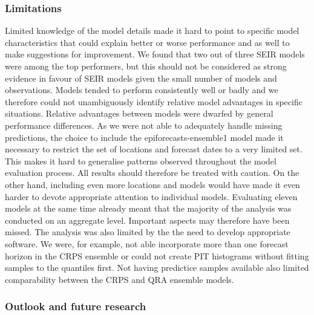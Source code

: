 \documentclass[
]{book}
\begin{document}
\hypertarget{limitations}{%
\subsubsection*{Limitations}\label{limitations}}

Limited knowledge of the model details made it hard to point to specific model characteristics that could explain better or worse performance and as well to make suggestions for improvement. We found that two out of three SEIR models were among the top performers, but this should not be considered as strong evidence in favour of SEIR models given the small number of models and observations. Models tended to perform consistently well or badly and we therefore could not unambiguously identify relative model advantages in specific situations. Relative advantages between models were dwarfed by general performance differences.
As we were not able to adequately handle missing predictions, the choice to include the epiforecasts-ensemble1 model made it necessary to restrict the set of locations and forecast dates to a very limited set. This makes it hard to generalise patterns observed throughout the model evaluation process. All results should therefore be treated with caution. On the other hand, including even more locations and models would have made it even harder to devote appropriate attention to individual models. Evaluating eleven models at the same time already meant that the majority of the analysis was conducted on an aggregate level. Important aspects may therefore have been missed.
The analysis was also limited by the the need to develop appropriate software. We were, for example, not able incorporate more than one forecast horizon in the CRPS ensemble or could not create PIT histograms without fitting samples to the quantiles first. Not having predictice samples available also limited comparability between the CRPS and QRA ensemble models.

\hypertarget{outlook-and-future-research}{%
\subsubsection*{Outlook and future research}\label{outlook-and-future-research}}
\end{document}
